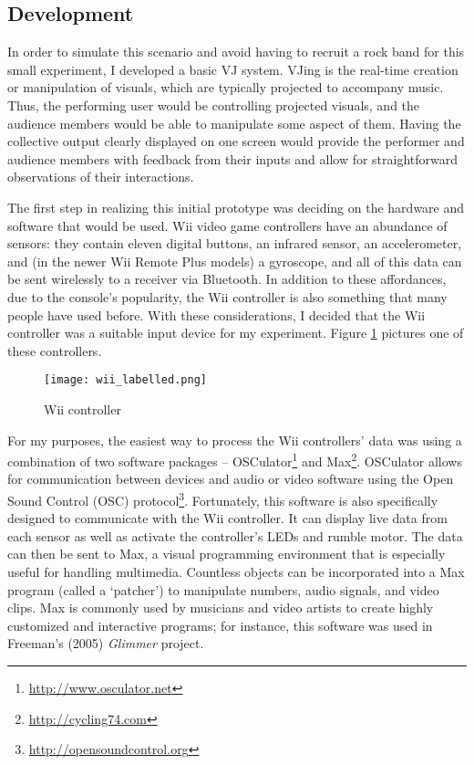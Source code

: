 
\subsection{Development}

In order to simulate this scenario and avoid having to recruit a rock band for this small experiment, I developed a basic VJ system. VJing is the real-time creation or manipulation of visuals, which are typically projected to accompany music. Thus, the performing user would be controlling projected visuals, and the audience members would be able to manipulate some aspect of them. Having the collective output clearly displayed on one screen would provide the performer and audience members with feedback from their inputs and allow for straightforward observations of their interactions.

The first step in realizing this initial prototype was deciding on the hardware and software that would be used. Wii video game controllers have an abundance of sensors: they contain eleven digital buttons, an infrared sensor, an accelerometer, and (in the newer Wii Remote Plus models) a gyroscope, and all of this data can be sent wirelessly to a receiver via Bluetooth. In addition to these affordances, due to the console's popularity, the Wii controller is also something that many people have used before. With these considerations, I decided that the Wii controller was a suitable input device for my experiment. Figure \ref{prototyping1.6} pictures one of these controllers.

\begin{figure}
	\centering

	\texttt{[image: wii\_labelled.png]}
	\caption{Wii controller}

	\label{prototyping1.6}
\end{figure}

For my purposes, the easiest way to process the Wii controllers' data was using a combination of two software packages -- OSCulator\footnote{\url{http://www.osculator.net}} and Max\footnote{\url{http://cycling74.com}}. OSCulator allows for communication between devices and audio or video software using the Open Sound Control (OSC) protocol\footnote{\url{http://opensoundcontrol.org}}. Fortunately, this software is also specifically designed to communicate with the Wii controller. It can display live data from each sensor as well as activate the controller's LEDs and rumble motor. The data can then be sent to Max, a visual programming environment that is especially useful for handling multimedia. Countless objects can be incorporated into a Max program (called a `patcher') to manipulate numbers, audio signals, and video clips. Max is commonly used by musicians and video artists to create highly customized and interactive programs; for instance, this software was used in Freeman's (2005) \textit{Glimmer} project.

